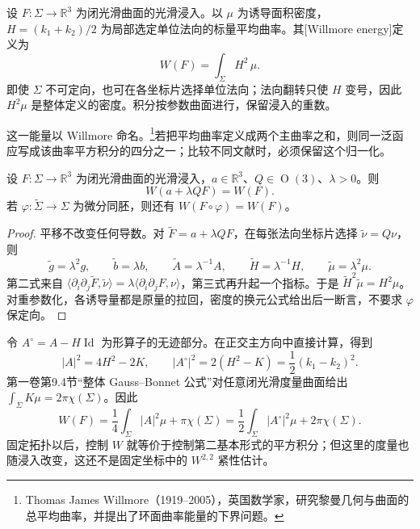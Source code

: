 \begin{definition}\label{g3:def:willmore-functional}
	设 \(F:\Sigma\to\mathbb R^3\) 为闭光滑曲面的光滑浸入。以 \(\mu\) 为诱导面积密度，\(H=(k_1+k_2)/2\) 为局部选定单位法向的标量平均曲率。其[Willmore energy]定义为
	\begin{equation}\label{g3:eq:willmore-functional}
		W(F)=\int_\Sigma H^2\,\mu.
	\end{equation}
	即使 \(\Sigma\) 不可定向，也可在各坐标片选择单位法向；法向翻转只使 \(H\) 变号，因此 \(H^2\mu\) 是整体定义的密度。积分按参数曲面进行，保留浸入的重数。
\end{definition}

这一能量以 Willmore 命名。\footnote{Thomas James Willmore（1919--2005），英国数学家，研究黎曼几何与曲面的总平均曲率，并提出了环面曲率能量的下界问题。}若把平均曲率定义成两个主曲率之和，则同一泛函应写成该曲率平方积分的四分之一；比较不同文献时，必须保留这个归一化。

\begin{proposition}\label{g3:prop:willmore-similarity-invariance}
	设 \(F:\Sigma\to\mathbb R^3\) 为闭光滑曲面的光滑浸入，\(a\in\mathbb R^3\)、\(Q\in\operatorname{O}(3)\)、\(\lambda>0\)。则
	\[
		W(a+\lambda QF)=W(F).
	\]
	若 \(\varphi:\widetilde\Sigma\to\Sigma\) 为微分同胚，则还有 \(W(F\circ\varphi)=W(F)\)。
\end{proposition}
\begin{proof}
	平移不改变任何导数。对 \(\widetilde F=a+\lambda QF\)，在每张法向坐标片选择 \(\widetilde\nu=Q\nu\)，则
	\[
		\widetilde g=\lambda^2g,\qquad
		\widetilde b=\lambda b,\qquad
		\widetilde A=\lambda^{-1}A,\qquad
		\widetilde H=\lambda^{-1}H,\qquad
		\widetilde\mu=\lambda^2\mu.
	\]
	第二式来自 \(\langle\partial_i\partial_j\widetilde F,\widetilde\nu\rangle=\lambda\langle\partial_i\partial_jF,\nu\rangle\)，第三式再升起一个指标。于是 \(\widetilde H^2\widetilde\mu=H^2\mu\)。对重参数化，各诱导量都是原量的拉回，密度的换元公式给出后一断言，不要求 \(\varphi\) 保定向。
\end{proof}

令 \(A^\circ=A-H\operatorname{Id}\) 为形算子的无迹部分。在正交主方向中直接计算，得到
\begin{equation}\label{g3:eq:willmore-curvature-algebra}
	|A|^2=4H^2-2K,\qquad
	|A^\circ|^2=2(H^2-K)=\frac12(k_1-k_2)^2.
\end{equation}
第一卷第9.4节“整体 Gauss--Bonnet 公式”对任意闭光滑度量曲面给出 \(\int_\Sigma K\mu=2\pi\chi(\Sigma)\)。因此
\begin{equation}\label{g3:eq:willmore-gauss-bonnet-decomposition}
	W(F)=\frac14\int_\Sigma|A|^2\mu+\pi\chi(\Sigma)
	=\frac12\int_\Sigma|A^\circ|^2\mu+2\pi\chi(\Sigma).
\end{equation}
固定拓扑以后，控制 \(W\) 就等价于控制第二基本形式的平方积分；但这里的度量也随浸入改变，这还不是固定坐标中的 \(W^{2,2}\) 紧性估计。

